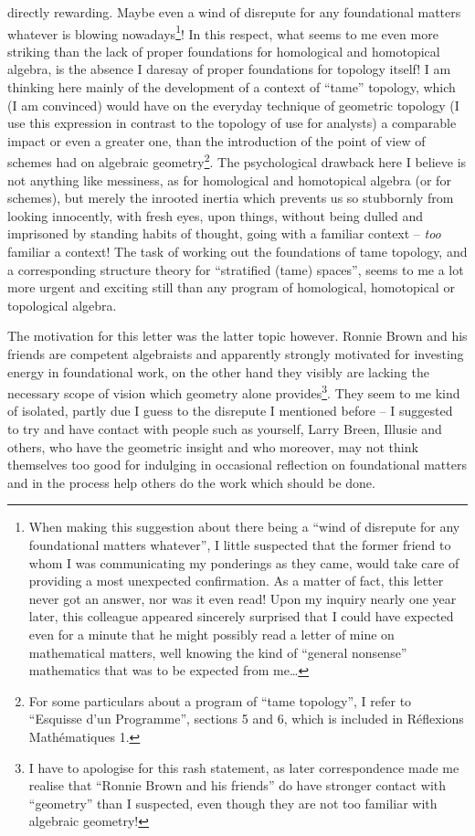 directly rewarding. Maybe even a wind of disrepute for any
foundational matters whatever is blowing nowadays\footnote{When making this suggestion about there being a ``wind of disrepute for any foundational matters whatever'', I little suspected that the former friend to whom I was communicating my ponderings as they came, would take care of providing a most unexpected confirmation. As a matter of fact, this letter never got an answer, nor was it even read! Upon my inquiry nearly one year later, this colleague appeared sincerely surprised that I could have expected even for a minute that he might possibly read a letter of mine on mathematical matters, well knowing the kind of ``general nonsense'' mathematics that was to be expected from me\dots}!  In this respect,
what seems to me even more striking than the lack of proper
foundations for homological and homotopical algebra, is the absence I
daresay of proper foundations for topology itself! I am thinking here
mainly of the development of a context of ``tame'' topology, which (I
am convinced) would have on the everyday technique of geometric
topology (I use this expression in contrast to the topology of use for
analysts) a comparable impact or even a greater one, than the
introduction of the point of view of schemes had on algebraic
geometry\footnote{For some particulars about a program of ``tame topology'', I refer to ``Esquisse d'un Programme'', sections 5 and 6, which is included in Réflexions Mathématiques 1.}. The psychological drawback here I believe is not anything
like messiness, as for homological and homotopical algebra (or for
schemes), but merely the inrooted inertia which prevents us so
stubbornly from looking innocently, with fresh eyes, upon things,
without being dulled and imprisoned by standing habits of thought,
going with a familiar context -- \emph{too} familiar a context! The
task of working out the foundations of tame topology, and a
corresponding structure theory for ``stratified (tame) spaces'', seems
to me a lot more urgent and exciting still
than any program of homological,
homotopical or topological algebra.

\label{sec:2}%
The motivation for this letter was the latter topic
however. Ronnie Brown and his friends are competent algebraists and
apparently strongly motivated for investing energy in foundational
work, on the other hand they visibly are lacking the necessary scope
of vision which geometry alone provides\footnote{I have to apologise for this rash statement, as later correspondence made me realise that ``Ronnie Brown and his friends'' do have stronger contact with ``geometry'' than I suspected, even though they are not too familiar with algebraic geometry!}. They seem to me kind of
isolated, partly due I guess to the disrepute I mentioned before -- I
suggested to try and have contact with people such as yourself, Larry
Breen, Illusie and others, who have the geometric insight and who
moreover, may not think themselves too good for indulging in
occasional reflection on foundational matters and in the process help
others do the work which should be done.

